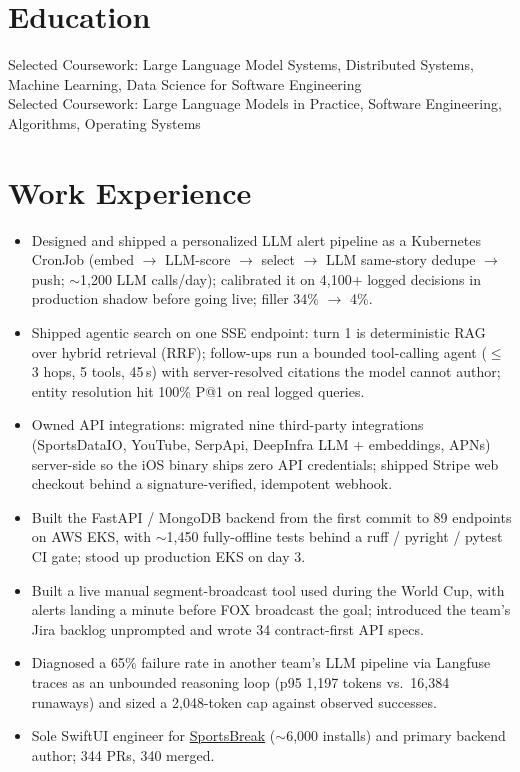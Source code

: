 \documentclass[11pt, letterpaper]{article}
\begin{document}

\section{Education}
Selected Coursework: Large Language Model Systems, Distributed Systems, Machine Learning, Data Science for Software Engineering\\[1pt]
Selected Coursework: Large Language Models in Practice, Software Engineering, Algorithms, Operating Systems

\section{Work Experience}
\begin{itemize}
  \item Designed and shipped a personalized LLM alert pipeline as a Kubernetes CronJob (embed $\to$ LLM-score $\to$ select $\to$ LLM same-story dedupe $\to$ push; $\sim$1{,}200 LLM calls/day); calibrated it on 4{,}100+ logged decisions in production shadow before going live; filler 34\% $\to$ 4\%.
  \item Shipped agentic search on one SSE endpoint: turn 1 is deterministic RAG over hybrid retrieval (RRF); follow-ups run a bounded tool-calling agent ($\le$3 hops, 5 tools, 45\,s) with server-resolved citations the model cannot author; entity resolution hit 100\% P@1 on real logged queries.
  \item Owned API integrations: migrated nine third-party integrations (SportsDataIO, YouTube, SerpApi, DeepInfra LLM + embeddings, APNs) server-side so the iOS binary ships zero API credentials; shipped Stripe web checkout behind a signature-verified, idempotent webhook.
  \item Built the FastAPI / MongoDB backend from the first commit to 89 endpoints on AWS EKS, with $\sim$1{,}450 fully-offline tests behind a ruff / pyright / pytest CI gate; stood up production EKS on day 3.
  \item Built a live manual segment-broadcast tool used during the World Cup, with alerts landing a minute before FOX broadcast the goal; introduced the team's Jira backlog unprompted and wrote 34 contract-first API specs.
  \item Diagnosed a 65\% failure rate in another team's LLM pipeline via Langfuse traces as an unbounded reasoning loop (p95 1{,}197 tokens vs.\ 16{,}384 runaways) and sized a 2{,}048-token cap against observed successes.
  \item Sole SwiftUI engineer for \href{https://apps.apple.com/app/id6762649287}{SportsBreak} ($\sim$6{,}000 installs) and primary backend author; 344 PRs, 340 merged.
\end{itemize}
\end{document}

